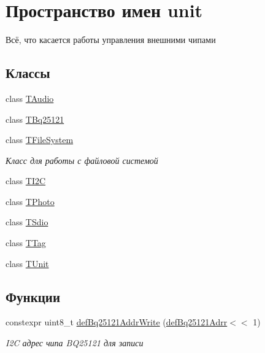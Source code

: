 \hypertarget{namespaceunit}{}\section{Пространство имен unit}
\label{namespaceunit}


Всё, что касается работы управления внешними чипами  


\subsection*{Классы}
\begin{DoxyCompactItemize}
\item 
class \hyperlink{classunit_1_1_t_audio}{T\+Audio}
\item 
class \hyperlink{classunit_1_1_t_bq25121}{T\+Bq25121}
\item 
class \hyperlink{classunit_1_1_t_file_system}{T\+File\+System}
\begin{DoxyCompactList}\small\item\em Класс для работы с файловой системой \end{DoxyCompactList}\item 
class \hyperlink{classunit_1_1_t_i2_c}{T\+I2C}
\item 
class \hyperlink{classunit_1_1_t_photo}{T\+Photo}
\item 
class \hyperlink{classunit_1_1_t_sdio}{T\+Sdio}
\item 
class \hyperlink{classunit_1_1_t_tag}{T\+Tag}
\item 
class \hyperlink{classunit_1_1_t_unit}{T\+Unit}
\end{DoxyCompactItemize}
\subsection*{Функции}
\begin{DoxyCompactItemize}
\item 
\mbox{\label{namespaceunit_a00a34096b0492123f3830e75447e59d7}} 
constexpr uint8\+\_\+t \hyperlink{namespaceunit_a00a34096b0492123f3830e75447e59d7}{def\+Bq25121\+Addr\+Write} (\hyperlink{namespaceunit_af46d6c2767dafd308cf474c40fbeb8ec}{def\+Bq25121\+Adrr}$<$$<$ 1)
\begin{DoxyCompactList}\small\item\em I2C адрес чипа B\+Q25121 для записи \end{DoxyCompactList}\end{DoxyCompactItemize}
